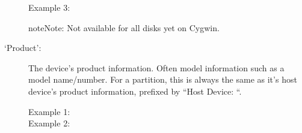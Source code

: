 \documentclass[letterpaper,10pt,english]{sphinxmanual}
\begin{document}
\begin{description}
\begin{description}
\item[{Example 3:}] \leavevmode
\begin{sphinxVerbatim}[commandchars=\\\{\}]
\PYG{p}{[}\PYG{p}{]}\PYG{p}{[}\PYG{p}{]}
\end{sphinxVerbatim}

\end{description}

\begin{sphinxadmonition}{note}{Note:}
Not available for all disks yet on Cygwin.
\end{sphinxadmonition}

\item[{‘Product’:}] \leavevmode
The device’s product information. Often model information such as a model
name/number. For a partition, this is always the same as it’s host device’s
product information, prefixed by “Host Device: “.
\begin{description}
\item[{Example 1:}] \leavevmode
\begin{sphinxVerbatim}[commandchars=\\\{\}]
\PYG{p}{[}\PYG{p}{]}\PYG{p}{[}\PYG{p}{]}
\end{sphinxVerbatim}

\item[{Example 2:}] \leavevmode
\begin{sphinxVerbatim}[commandchars=\\\{\}]
\PYG{p}{[}\PYG{p}{]}\PYG{p}{[}\PYG{p}{]}
\end{sphinxVerbatim}


\end{description}
\end{description}
\end{document}

